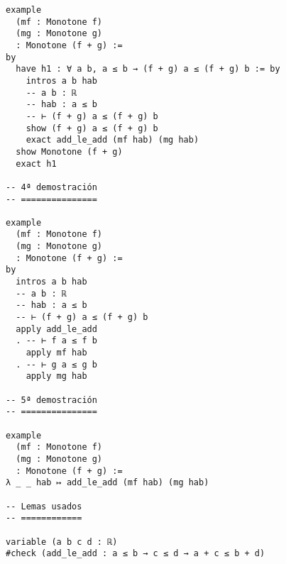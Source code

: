 \begin{verbatim}
example
  (mf : Monotone f)
  (mg : Monotone g)
  : Monotone (f + g) :=
by
  have h1 : ∀ a b, a ≤ b → (f + g) a ≤ (f + g) b := by
    intros a b hab
    -- a b : ℝ
    -- hab : a ≤ b
    -- ⊢ (f + g) a ≤ (f + g) b
    show (f + g) a ≤ (f + g) b
    exact add_le_add (mf hab) (mg hab)
  show Monotone (f + g)
  exact h1

-- 4ª demostración
-- ===============

example
  (mf : Monotone f)
  (mg : Monotone g)
  : Monotone (f + g) :=
by
  intros a b hab
  -- a b : ℝ
  -- hab : a ≤ b
  -- ⊢ (f + g) a ≤ (f + g) b
  apply add_le_add
  . -- ⊢ f a ≤ f b
    apply mf hab
  . -- ⊢ g a ≤ g b
    apply mg hab

-- 5ª demostración
-- ===============

example
  (mf : Monotone f)
  (mg : Monotone g)
  : Monotone (f + g) :=
λ _ _ hab ↦ add_le_add (mf hab) (mg hab)

-- Lemas usados
-- ============

variable (a b c d : ℝ)
#check (add_le_add : a ≤ b → c ≤ d → a + c ≤ b + d)
\end{verbatim}

